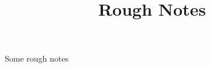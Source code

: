 \documentclass{article}
\title{Rough Notes}
\begin{document}
    \maketitle
    Some rough notes
\end{document}
